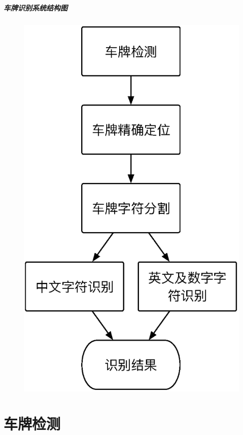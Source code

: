 \documentclass[UTF8]{beamer}
\begin{document}
\begin{frame}
  \frametitle{车牌识别系统结构图}
  \begin{figure}[ht]
    \centering
    \includegraphics[height=0.8\textheight]{./Figure/SystemArch.eps}
  \end{figure}
\end{frame}

\part{车牌检测}
\end{document}
